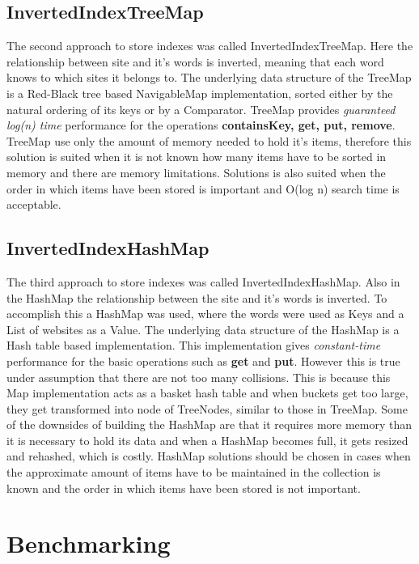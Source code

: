 \subsection{InvertedIndexTreeMap}
The second approach to store indexes was called InvertedIndexTreeMap. Here the relationship between site and it's words is inverted, meaning that each word knows to which sites it belongs to. The underlying data structure of the TreeMap is a Red-Black tree based NavigableMap implementation, sorted either by the natural ordering of its keys or by a Comparator. TreeMap provides \textit{guaranteed log(n) time} performance for the operations \textbf{containsKey, get, put, remove}.\cite{oracle:treemap} TreeMap use only the amount of memory needed to hold it's items, therefore this solution is suited when it is not known how many items have to be sorted in memory and there are memory limitations. Solutions is also suited when the order in which items have been stored is important and O(log n) search time is acceptable. \cite{baeldung:HashTreeCompared}

\subsection{InvertedIndexHashMap}
The third approach to store indexes was called InvertedIndexHashMap. Also in the HashMap the relationship between the site and it's words is inverted. To accomplish this a HashMap was used, where the words were used as Keys and  a List of websites as a Value.
The underlying data structure of the HashMap is a Hash table based implementation. This implementation gives \textit{constant-time} performance for the basic operations such as \textbf{get} and \textbf{put}. \cite{oracle:hashmap} However this is true under assumption that there are not too many collisions. This is because this Map implementation acts as a basket hash table and when buckets get too large, they get transformed into node of TreeNodes, similar to those in TreeMap. \cite{baeldung:HashTreeCompared} Some of the downsides of building the HashMap are that it requires more memory than it is necessary to hold its data and when a HashMap becomes full, it gets resized and rehashed, which is costly. HashMap solutions should be chosen in cases when the approximate amount of items have to be maintained in the collection is known and the order in which items have been stored is not important. \cite{baeldung:HashTreeCompared}


\section{Benchmarking}

